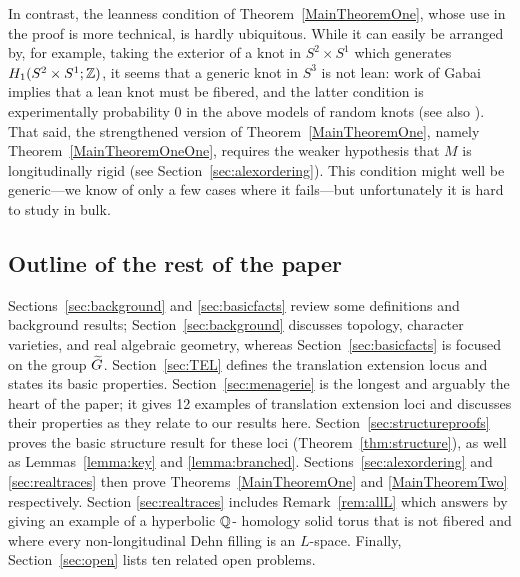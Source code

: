 \documentclass[tikz, sepfignums, defaultenums]{nmd/article}
\begin{document}
In contrast, the leanness condition of Theorem~\ref{MainTheoremOne},
whose use in the proof is more technical, is hardly ubiquitous.
While it can easily be arranged by, for example, taking the exterior
of a knot in $S^2 \times S^1$ which generates
$H_1(S^2 \times S^1; {\mathbb Z})$, it seems that a generic knot in $S^3$ is
not lean: work of Gabai \cite{Gabai1987} implies that a lean knot must
be fibered, and the latter condition is experimentally probability 0
in the above models of random knots (see also
\cite{DunfieldThurston2006}).  That said, the strengthened version of
Theorem~\ref{MainTheoremOne}, namely Theorem~\ref{MainTheoremOneOne},
requires the weaker hypothesis that $M$ is longitudinally rigid (see
Section~\ref{sec:alexordering}).  This condition might well be
generic---we know of only a few cases where it fails---but
unfortunately it is hard to study in bulk.




\subsection{Outline of the rest of the paper}

Sections~\ref{sec:background} and \ref{sec:basicfacts} review some
definitions and background results; Section~\ref{sec:background}
discusses topology, character varieties, and real algebraic geometry,
whereas Section~\ref{sec:basicfacts} is focused on the group $\Gtil$.
Section~\ref{sec:TEL} defines the translation extension locus and
states its basic properties.  Section~\ref{sec:menagerie} is the
longest and arguably the heart of the paper; it gives 12 examples of
translation extension loci and discusses their properties as they
relate to our results here.  Section~\ref{sec:structureproofs} proves
the basic structure result for these loci
(Theorem~\ref{thm:structure}), as well as Lemmas~\ref{lemma:key} and
\ref{lemma:branched}.  Sections~\ref{sec:alexordering} and
\ref{sec:realtraces} then prove Theorems~\ref{MainTheoremOne} and
\ref{MainTheoremTwo} respectively.  Section \ref{sec:realtraces}
includes Remark~\ref{rem:allL} which answers \cite[Question
6]{LidmanWatson2014} by giving an example of a hyperbolic ${\mathbb Q}$\hyp
homology solid torus that is not fibered and where every
non-longitudinal Dehn filling is an $L$-space.  Finally,
Section~\ref{sec:open} lists ten related open problems.
\end{document}
